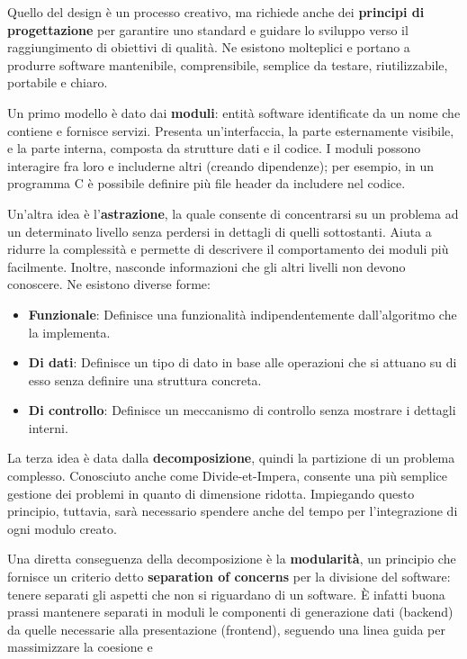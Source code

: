 \noindent Quello del design è un processo creativo, ma richiede anche dei \textbf{principi di progettazione} per garantire uno standard e guidare lo
sviluppo verso il raggiungimento di obiettivi di qualità. Ne esistono molteplici e portano a produrre software mantenibile, comprensibile, semplice da
testare, riutilizzabile, portabile e chiaro.\par
Un primo modello è dato dai \textbf{moduli}: entità software identificate da un nome che contiene e fornisce servizi. Presenta un'interfaccia, la parte
esternamente visibile, e la parte interna, composta da strutture dati e il codice. I moduli possono interagire fra loro e includerne altri
(creando dipendenze); per esempio, in un programma C è possibile definire più file header da includere nel codice.\par
Un'altra idea è l'\textbf{astrazione}, la quale consente di concentrarsi su un problema ad un determinato livello senza perdersi in dettagli di quelli
sottostanti. Aiuta a ridurre la complessità e permette di descrivere il comportamento dei moduli più facilmente. Inoltre, nasconde informazioni che gli
altri livelli non devono conoscere. Ne esistono diverse forme: \begin{itemize}
	\item \textbf{Funzionale}: Definisce una funzionalità indipendentemente dall'algoritmo che la implementa.
	\item \textbf{Di dati}: Definisce un tipo di dato in base alle operazioni che si attuano su di esso senza definire una struttura concreta.
	\item \textbf{Di controllo}: Definisce un meccanismo di controllo senza mostrare i dettagli interni.
\end{itemize}
\noindent La terza idea è data dalla \textbf{decomposizione}, quindi la partizione di un problema complesso. Conosciuto anche come Divide-et-Impera,
consente una più semplice gestione dei problemi in quanto di dimensione ridotta. Impiegando questo principio, tuttavia, sarà necessario spendere anche
del tempo per l'integrazione di ogni modulo creato.\par
Una diretta conseguenza della decomposizione è la \textbf{modularità}, un principio che fornisce un criterio detto \textbf{separation of concerns} per
la divisione del software: tenere separati gli aspetti che non si riguardano di un software. È infatti buona prassi mantenere separati in moduli le
componenti di generazione dati (backend) da quelle necessarie alla presentazione (frontend), seguendo una linea guida per massimizzare la coesione e
